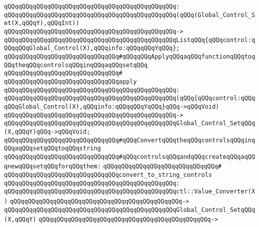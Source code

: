 \verb|qQQqqQQqqQQqqQQqqQQqqQQqqQQqqQQqqQQqqQQqqQQqqQQq:|\newline
\verb|qQQqqQQqqQQqqQQqqQQqqQQqqQQqqQQqqQQqqQQqqQQqqQQq(qQQq(Global_Control_Set(X,qQQqY),qQQqInt))|\newline
\verb|qQQqqQQqqQQqqQQqqQQqqQQqqQQqqQQqqQQqqQQqqQQqqQQq->|\newline
\verb|qQQqqQQqqQQqqQQqqQQqqQQqqQQqqQQqqQQqqQQqqQQqqQQqListqQQq{qQQqcontrol:qQQqqQQqGlobal_Control(X),qQQqinfo:qQQqqQQqYqQQq};|\newline
\newline
\newline
\verb|qQQqqQQqqQQqqQQqqQQqqQQqqQQqqQQq#qQQqqQQqApplyqQQqaqQQqfunctionqQQqtoqQQqtheqQQqcontrolsqQQqinqQQqaqQQqsetqQQq|\newline
\verb|qQQqqQQqqQQqqQQqqQQqqQQqqQQqqQQq#|\newline
\verb|qQQqqQQqqQQqqQQqqQQqqQQqqQQqqQQqapply|\newline
\verb|qQQqqQQqqQQqqQQqqQQqqQQqqQQqqQQqqQQqqQQqqQQqqQQq:|\newline
\verb|qQQqqQQqqQQqqQQqqQQqqQQqqQQqqQQqqQQqqQQqqQQqqQQq(qQQq{qQQqcontrol:qQQqqQQqGlobal_Control(X),qQQqinfo:qQQqqQQqYqQQq}qQQq->qQQqVoid)|\newline
\verb|qQQqqQQqqQQqqQQqqQQqqQQqqQQqqQQqqQQqqQQqqQQqqQQq->|\newline
\verb|qQQqqQQqqQQqqQQqqQQqqQQqqQQqqQQqqQQqqQQqqQQqqQQqGlobal_Control_SetqQQq(X,qQQqY)qQQq->qQQqVoid;|\newline
\newline
\verb|qQQqqQQqqQQqqQQqqQQqqQQqqQQqqQQq#qQQqConvertqQQqtheqQQqcontrolsqQQqinqQQqaqQQqsetqQQqtoqQQqstring|\newline
\verb|qQQqqQQqqQQqqQQqqQQqqQQqqQQqqQQq#qQQqcontrolsqQQqandqQQqcreateqQQqaqQQqnewqQQqsetqQQqforqQQqthem:|\newline
\verb|qQQqqQQqqQQqqQQqqQQqqQQqqQQqqQQq#|\newline
\verb|qQQqqQQqqQQqqQQqqQQqqQQqqQQqqQQqconvert_to_string_controls|\newline
\verb|qQQqqQQqqQQqqQQqqQQqqQQqqQQqqQQqqQQqqQQqqQQqqQQq:|\newline
\verb|qQQqqQQqqQQqqQQqqQQqqQQqqQQqqQQqqQQqqQQqqQQqqQQqctl::Value_Converter(X)|\newline
\verb|qQQqqQQqqQQqqQQqqQQqqQQqqQQqqQQqqQQqqQQqqQQqqQQq->|\newline
\verb|qQQqqQQqqQQqqQQqqQQqqQQqqQQqqQQqqQQqqQQqqQQqqQQqGlobal_Control_SetqQQq(X,qQQqY)|\newline
\verb|qQQqqQQqqQQqqQQqqQQqqQQqqQQqqQQqqQQqqQQqqQQqqQQq->|\newline
